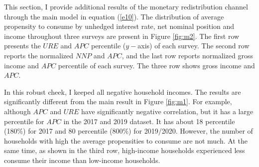 \documentclass[11pt,letterpaper]{article}
\begin{document}
This section, I provide additional results of the monetary redistribution channel through the main model in equation (\ref{e10}). The distribution of average propensity to consume by unhedged interest rate, net nominal position and income throughout three surveys are present in Figure \ref{fig:m2}. The first row presents the $URE$ and $APC$ percentile ($y-$axis) of each survey. The second row reports the normalized $NNP$ and $APC$, and the last row reports normalized gross income and $APC$ percentile of each survey. The three row shows gross income and $APC$.     

In this robust cheek, I keeped all negative household incomes. The results are significantly different from the main result in Figure \ref{fig:m1}. For example, although $APC$ and $URE$ have significantly negative correlation, but it has a large percentile for $APC$ in the 2017 and 2019 dataset. It has about 18 percentile (180\%) for 2017 and 80 percentile (800\%) for 2019/2020. However, the number of households with high the average propensities to consume are not much. At the same time, as shown in the third row, high-income households experienced less consume their income than low-income households.    
\end{document}

